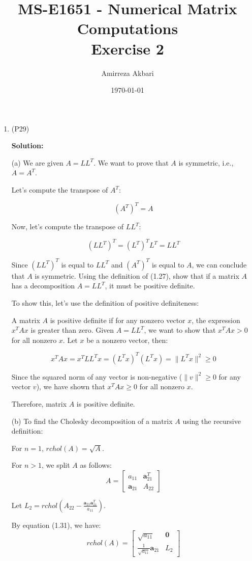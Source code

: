 \documentclass[12pt]{article}
\title{MS-E1651 - Numerical Matrix Computations
\\Exercise 2}
\author{Amirreza Akbari}
\date{\today}
\begin{document}
\maketitle
\begin{enumerate}[leftmargin=\labelsep]
	\item (P29) 

\textbf{Solution:} 
	
(a) We are given \(A = LL^T\). We want to prove that \(A\) is symmetric, i.e., \(A = A^T\).

Let's compute the transpose of \(A^T\):

\[
(A^T)^T = A
\]

Now, let's compute the transpose of \(LL^T\):

\[
(LL^T)^T = (L^T)^T L^T = LL^T
\]

Since \((LL^T)^T\) is equal to \(LL^T\) and \((A^T)^T\) is equal to \(A\), we can conclude that \(A\) is symmetric. Using the definition of (1.27), show that if a matrix \(A\) has a decomposition \(A = LL^T\), it must be positive definite.

To show this, let's use the definition of positive definiteness:

A matrix \(A\) is positive definite if for any nonzero vector \(x\), the expression \(x^TAx\) is greater than zero. Given \(A = LL^T\), we want to show that \(x^TAx > 0\) for all nonzero \(x\). Let \(x\) be a nonzero vector, then:

\[
x^TAx = x^TLL^Tx = (L^Tx)^T(L^Tx) = \|L^Tx\|^2 \geq 0
\]

Since the squared norm of any vector is non-negative (\(\|v\|^2 \geq 0\) for any vector \(v\)), we have shown that \(x^TAx \geq 0\) for all nonzero \(x\).

Therefore, matrix \(A\) is positive definite.

(b) To find the Cholesky decomposition of a matrix \(A\) using the recursive definition:

For \(n = 1\), \(rchol(A) = \sqrt{A}\).

For \(n > 1\), we split \(A\) as follows:
\[
A = \begin{bmatrix}
a_{11} & \mathbf{a}_{21}^T \\
\mathbf{a}_{21} & A_{22}
\end{bmatrix}
\]

Let \(L_2 = rchol\left(A_{22} - \frac{\mathbf{a}_{21}\mathbf{a}_{21}^T}{a_{11}}\right)\).

By equation (1.31), we have:
\[
rchol(A) = \begin{bmatrix}
\sqrt{a_{11}} & \mathbf{0} \\
\frac{1}{\sqrt{a_{11}}} \mathbf{a}_{21} & L_2
\end{bmatrix}
\] 


\end{enumerate}
\end{document}
